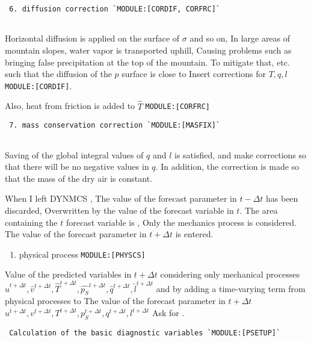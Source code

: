 \begin{verbatim}
 6. diffusion correction `MODULE:[CORDIF, CORFRC]`
     
\end{verbatim}

Horizontal diffusion is applied on the surface of \(\sigma\) and so on,
In large areas of mountain slopes, water vapor is transported uphill,
Causing problems such as bringing false precipitation at the top of the
mountain. To mitigate that, etc. such that the diffusion of the \(p\)
surface is close to Insert corrections for \(T,q,l\)
\texttt{MODULE:{[}CORDIF{]}}.

Also, heat from friction is added to \(\hat{T}\)
\texttt{MODULE:{[}CORFRC{]}}

\begin{verbatim}
 7. mass conservation correction `MODULE:[MASFIX]`
     
\end{verbatim}

Saving of the global integral values of \(q\) and \(l\) is satisfied,
and make corrections so that there will be no negative values in \(q\).
In addition, the correction is made so that the mass of the dry air is
constant.

When I left DYNMCS , The value of the forecast parameter in
\(t-\Delta t\) has been discarded, Overwritten by the value of the
forecast variable in \(t\). The area containing the \(t\) forecast
variable is , Only the mechanics process is considered. The value of the
forecast parameter in \(t+\Delta t\) is entered.

\begin{enumerate}
\def\labelenumi{\arabic{enumi}.}
\setcounter{enumi}{4}
\tightlist
\item
  physical process \texttt{MODULE:{[}PHYSCS{]}}
\end{enumerate}

Value of the predicted variables in \(t+\Delta t\) considering only
mechanical processes
\(\hat{u}^{t+\Delta t}, \hat{v}^{t+\Delta t}, \hat{T}^{t+\Delta t}, \hat{p_S}^{t+\Delta t}, \hat{q}^{t+\Delta t}, \hat{l}^{t+\Delta t}\)
and by adding a time-varying term from physical processes to The value
of the forecast parameter in \(t+\Delta t\)
\(u^{t+\Delta t}, v^{t+\Delta t}, T^{t+\Delta t}, p_S^{t+\Delta t}, q^{t+\Delta t}, l^{t+\Delta t}\)
Ask for .

\begin{verbatim}
 Calculation of the basic diagnostic variables `MODULE:[PSETUP]`
     
\end{verbatim}


